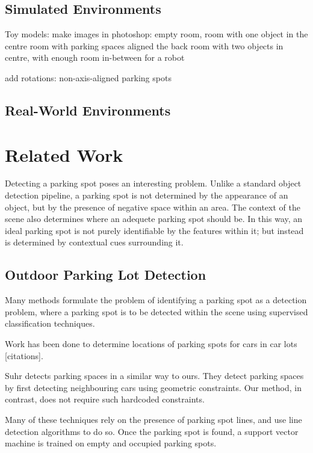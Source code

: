 \subsection{Simulated Environments}
Toy models: make images in photoshop:
empty room,
room with one object in the centre
room with parking spaces aligned the back
room with two objects in centre, with enough room in-between for a robot

add rotations:
non-axis-aligned parking spots

\subsection{Real-World Environments}

\section{Related Work}
\label{sec:parkinglotidentificationlitreview}
Detecting a parking spot poses an interesting problem. Unlike a standard object
detection pipeline, a parking spot is not determined by the appearance of an
object, but by the presence of negative space within an area. The context of the
scene also determines where an adequete parking spot should be. In this way, an
ideal parking spot is not purely identifiable by the features within it; but
instead is determined by contextual cues surrounding it.


\subsection{Outdoor Parking Lot Detection}

Many methods formulate the problem of identifying a parking spot
as a detection problem, where a parking spot is to be detected within the scene
using supervised classification techniques.

Work has been done to determine locations of parking spots for cars in car lots
[citations]. 
\cite{wu2006parking, true2007vacant}

Suhr \cite{suhr2010automatic} detects parking spaces in a similar way to ours.
They detect parking spaces by first detecting neighbouring cars using geometric
constraints. Our method, in contrast, does not require such hardcoded
constraints.


Many of these techniques rely on the presence of parking spot
lines, and use line detection algorithms to do so. Once the parking spot is
found, a support vector machine is trained on empty and occupied parking spots.

